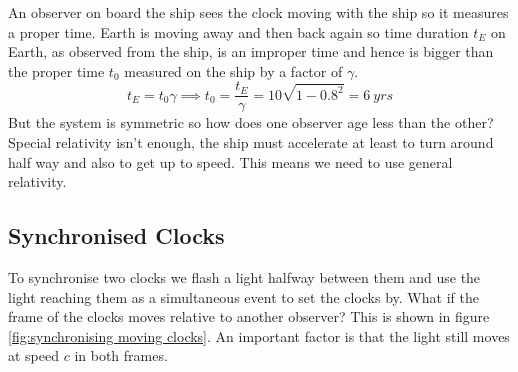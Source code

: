 \documentclass{article}
\begin{document}
    An observer on board the ship sees the clock moving with the ship so it measures a proper time. 
    Earth is moving away and then back again so time duration \(t_E\) on Earth, as observed from the ship, is an improper time and hence is bigger than the proper time \(t_0\) measured on the ship by a factor of \(\gamma\).
    \[t_E = t_0\gamma\implies t_0 = \frac{t_E}{\gamma} = 10\sqrt{1-0.8^2} = \SI{6}{yrs}\]
    But the system is symmetric so how does one observer age less than the other? 
    Special relativity isn't enough, the ship must accelerate at least to turn around half way and also to get up to speed. 
    This means we need to use general relativity.
    
    \subsection{Synchronised Clocks}
    To synchronise two clocks we flash a light halfway between them and use the light reaching them as a simultaneous event to set the clocks by.
    What if the frame of the clocks moves relative to another observer?
    This is shown in figure \ref{fig:synchronising moving clocks}.
    An important factor is that the light still moves at speed \(c\) in both frames.
\end{document}
